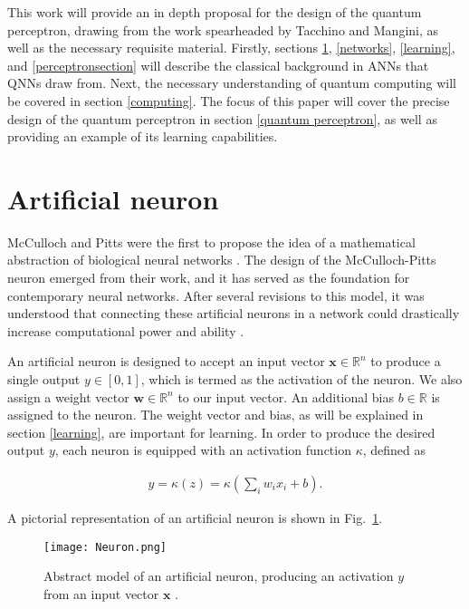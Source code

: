 \documentclass[twocolumn,superscriptaddress]{revtex4-1}
\begin{document}
This work will provide an in depth proposal for the design of the quantum perceptron, drawing from the work spearheaded by Tacchino and Mangini, as well as the necessary requisite material. Firstly, sections \ref{artificial}, \ref{networks}, \ref{learning}, and \ref{perceptronsection} will describe the classical background in ANNs that QNNs draw from. Next, the necessary understanding of quantum computing will be covered in section \ref{computing}. The focus of this paper will cover the precise design of the quantum perceptron in section \ref{quantum perceptron}, as well as providing an example of its learning capabilities.

\section{Artificial neuron} \label{artificial}
McCulloch and Pitts were the first to propose the idea of a mathematical abstraction of biological neural networks \cite{McCulloch1943-MCCALC-5}. The design of the McCulloch-Pitts neuron emerged from their work, and it has served as the foundation for contemporary neural networks. After several revisions to this model, it was understood that connecting these artificial neurons in a network could drastically increase computational power and ability \cite{Basheer2001}.

An artificial neuron is designed to accept an input vector $\bm{x} \in \mathbb{R}^n$ to produce a single output $y \in [0, 1]$, which is termed as the activation of the neuron. We also assign a weight vector $\bm{w} \in \mathbb{R}^n$ to our input vector. An additional bias $b \in \mathbb{R}$ is assigned to the neuron. The weight vector and bias, as will be explained in section \ref{learning}, are important for learning. In order to produce the desired output $y$, each neuron is equipped with an activation function $\kappa$, defined as 

\begin{equation} \label{eq:neuron_math}
\begin{split}
y = \kappa(z) = \kappa \left(\sum_i w_i x_i + b\right).
\end{split}
\end{equation}

A pictorial representation of an artificial neuron is shown in Fig.~\ref{fig:neuron}.

\begin{figure}[t!]
\texttt{[image: Neuron.png]}
\caption{Abstract model of an artificial neuron, producing an activation $y$ from an input vector $\bm{x}$ \cite{Beer:2022wgv}.}
\label{fig:neuron}
\end{figure}
\end{document}
